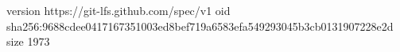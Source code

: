 version https://git-lfs.github.com/spec/v1
oid sha256:9688cdee0417167351003ed8bef719a6583efa549293045b3cb0131907228e2d
size 1973
